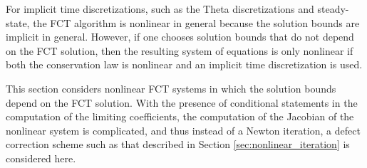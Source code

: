For implicit time discretizations, such as the Theta discretizations
and steady-state, the FCT algorithm is nonlinear in general because the
solution bounds are implicit in general.
However, if one chooses solution bounds that do not depend on the FCT solution,
then the resulting system of equations is only nonlinear if both the conservation law
is nonlinear and an implicit time discretization is used.

This section considers nonlinear FCT systems in which the solution
bounds depend on the FCT solution. With the presence of
conditional statements in the computation of the limiting coefficients,
the computation of the Jacobian of the nonlinear system is complicated,
and thus instead of a Newton iteration, a defect correction scheme
such as that described in Section \ref{sec:nonlinear_iteration} is
considered here.

